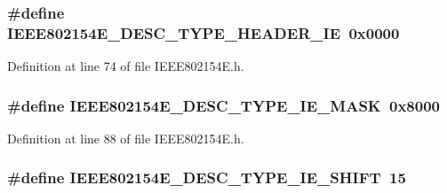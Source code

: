 \subsubsection[{\texorpdfstring{I\+E\+E\+E802154\+E\+\_\+\+D\+E\+S\+C\+\_\+\+T\+Y\+P\+E\+\_\+\+H\+E\+A\+D\+E\+R\+\_\+\+IE}{IEEE802154E_DESC_TYPE_HEADER_IE}}]{\setlength{\rightskip}{0pt plus 5cm}\#define I\+E\+E\+E802154\+E\+\_\+\+D\+E\+S\+C\+\_\+\+T\+Y\+P\+E\+\_\+\+H\+E\+A\+D\+E\+R\+\_\+\+IE~0x0000}\hypertarget{group___i_e_e_e802154_e_gac564134ae8a4fe97e0530f9de6cc70f1}{}\label{group___i_e_e_e802154_e_gac564134ae8a4fe97e0530f9de6cc70f1}


Definition at line 74 of file I\+E\+E\+E802154\+E.\+h.

\subsubsection[{\texorpdfstring{I\+E\+E\+E802154\+E\+\_\+\+D\+E\+S\+C\+\_\+\+T\+Y\+P\+E\+\_\+\+I\+E\+\_\+\+M\+A\+SK}{IEEE802154E_DESC_TYPE_IE_MASK}}]{\setlength{\rightskip}{0pt plus 5cm}\#define I\+E\+E\+E802154\+E\+\_\+\+D\+E\+S\+C\+\_\+\+T\+Y\+P\+E\+\_\+\+I\+E\+\_\+\+M\+A\+SK~0x8000}\hypertarget{group___i_e_e_e802154_e_gacc72bfbbcc2c4611e3dd6910b71bef41}{}\label{group___i_e_e_e802154_e_gacc72bfbbcc2c4611e3dd6910b71bef41}


Definition at line 88 of file I\+E\+E\+E802154\+E.\+h.

\subsubsection[{\texorpdfstring{I\+E\+E\+E802154\+E\+\_\+\+D\+E\+S\+C\+\_\+\+T\+Y\+P\+E\+\_\+\+I\+E\+\_\+\+S\+H\+I\+FT}{IEEE802154E_DESC_TYPE_IE_SHIFT}}]{\setlength{\rightskip}{0pt plus 5cm}\#define I\+E\+E\+E802154\+E\+\_\+\+D\+E\+S\+C\+\_\+\+T\+Y\+P\+E\+\_\+\+I\+E\+\_\+\+S\+H\+I\+FT~15}\hypertarget{group___i_e_e_e802154_e_ga1681391f82a2760c01e9041c5615e8c9}{}\label{group___i_e_e_e802154_e_ga1681391f82a2760c01e9041c5615e8c9}


